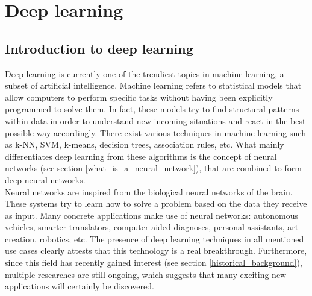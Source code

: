 
\chapter{Deep learning}
\label{ch:deep_learning}

\section{Introduction to deep learning}
Deep learning is currently one of the trendiest topics in machine learning, a subset of artificial intelligence. Machine learning refers to statistical models that allow computers to perform specific tasks without having been explicitly programmed to solve them. In fact, these models try to find structural patterns within data in order to understand new incoming situations and react in the best possible way accordingly. There exist various techniques in machine learning such as k-NN, SVM, k-means, decision trees, association rules, etc. What mainly differentiates deep learning from these algorithms is the concept of neural networks (see section  \ref{what_is_a_neural_network}), that are combined to form deep neural networks.\\
Neural networks are inspired from the biological neural networks of the brain. These systems try to learn how to solve a problem based on the data they receive as input. Many concrete applications make use of neural networks: autonomous vehicles, smarter translators, computer-aided diagnoses, personal assistants, art creation, robotics, etc. The presence of deep learning techniques in all mentioned use cases clearly attests that this technology is a real breakthrough. Furthermore, since this field has recently gained interest   (see section \ref{historical_background}), multiple researches are still ongoing, which suggests that many exciting new applications will certainly be discovered.

